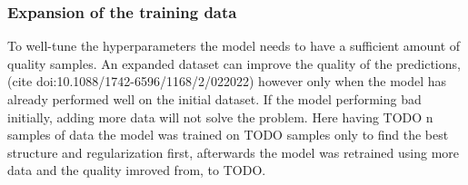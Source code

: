 \subsubsection{Expansion of the training data}
To well-tune the hyperparameters the model needs to have a sufficient amount of quality samples. An expanded dataset
can improve the quality of the predictions, (cite doi:10.1088/1742-6596/1168/2/022022) however only when the model has already performed well on the initial dataset. If the model performing bad initially, adding more data will not solve the problem. Here having TODO n samples of data the model was trained on TODO samples only to find the best structure and regularization first, afterwards the model was retrained using more data and the quality imroved from, to TODO.